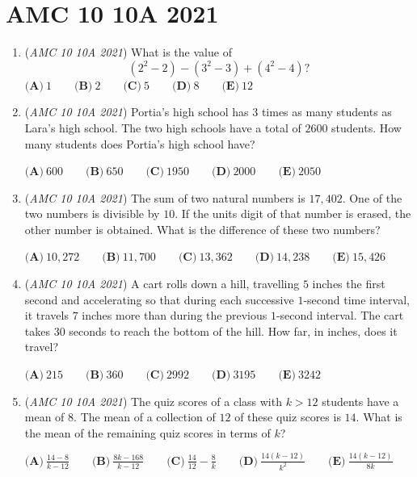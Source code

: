 \section{AMC 10 10A 2021}
        \begin{enumerate}
        	\item (\textit{AMC 10 10A 2021}) What is the value of
 \[(2^2-2)-(3^2-3)+(4^2-4)?\]$\textbf{(A)} ~1 \qquad\textbf{(B)} ~2 \qquad\textbf{(C)} ~5 \qquad\textbf{(D)} ~8 \qquad\textbf{(E)} ~12$


	\item (\textit{AMC 10 10A 2021}) Portia's high school has $3$ times as many students as Lara's high school. The two high schools have a total of $2600$ students. How many students does Portia's high school have?


 $\textbf{(A)} ~600 \qquad\textbf{(B)} ~650 \qquad\textbf{(C)} ~1950 \qquad\textbf{(D)} ~2000\qquad\textbf{(E)} ~2050$


	\item (\textit{AMC 10 10A 2021}) The sum of two natural numbers is $17{,}402$. One of the two numbers is divisible by $10$. If the units digit of that number is erased, the other number is obtained. What is the difference of these two numbers?


 $\textbf{(A)} ~10{,}272\qquad\textbf{(B)} ~11{,}700\qquad\textbf{(C)} ~13{,}362\qquad\textbf{(D)} ~14{,}238\qquad\textbf{(E)} ~15{,}426$


	\item (\textit{AMC 10 10A 2021}) A cart rolls down a hill, travelling $5$ inches the first second and accelerating so that during each successive $1$-second time interval, it travels $7$ inches more than during the previous $1$-second interval. The cart takes $30$ seconds to reach the bottom of the hill. How far, in inches, does it travel?


 $\textbf{(A)} ~215 \qquad\textbf{(B)} ~360\qquad\textbf{(C)} ~2992\qquad\textbf{(D)} ~3195\qquad\textbf{(E)} ~3242$


	\item (\textit{AMC 10 10A 2021}) The quiz scores of a class with $k > 12$ students have a mean of $8$. The mean of a collection of $12$ of these quiz scores is $14$. What is the mean of the remaining quiz scores in terms of $k$?


 $\textbf{(A)} ~\frac{14-8}{k-12} \qquad\textbf{(B)} ~\frac{8k-168}{k-12} \qquad\textbf{(C)} ~\frac{14}{12} - \frac{8}{k} \qquad\textbf{(D)} ~\frac{14(k-12)}{k^2} \qquad\textbf{(E)} ~\frac{14(k-12)}{8k}$



\end{enumerate}
